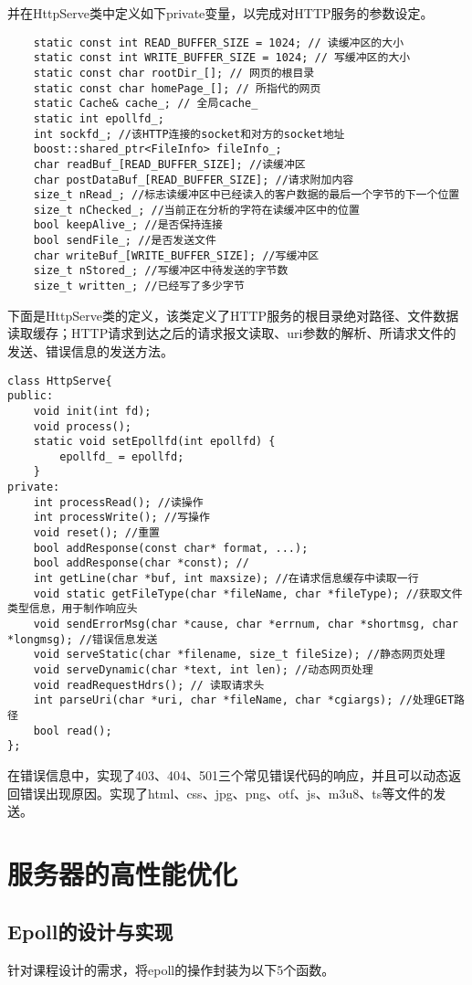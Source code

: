 \documentclass[bachelor]{thesis-uestc}
\begin{document}
并在HttpServe类中定义如下private变量，以完成对HTTP服务的参数设定。
\begin{lstlisting}
	static const int READ_BUFFER_SIZE = 1024; // 读缓冲区的大小
	static const int WRITE_BUFFER_SIZE = 1024; // 写缓冲区的大小
	static const char rootDir_[]; // 网页的根目录
	static const char homePage_[]; // 所指代的网页
	static Cache& cache_; // 全局cache_
	static int epollfd_;
	int sockfd_; //该HTTP连接的socket和对方的socket地址
	boost::shared_ptr<FileInfo> fileInfo_;
	char readBuf_[READ_BUFFER_SIZE]; //读缓冲区
	char postDataBuf_[READ_BUFFER_SIZE]; //请求附加内容
	size_t nRead_; //标志读缓冲区中已经读入的客户数据的最后一个字节的下一个位置
	size_t nChecked_; //当前正在分析的字符在读缓冲区中的位置
	bool keepAlive_; //是否保持连接
	bool sendFile_; //是否发送文件
	char writeBuf_[WRITE_BUFFER_SIZE]; //写缓冲区
	size_t nStored_; //写缓冲区中待发送的字节数
	size_t written_; //已经写了多少字节
\end{lstlisting}

下面是HttpServe类的定义，该类定义了HTTP服务的根目录绝对路径、文件数据读取缓存；HTTP请求到达之后的请求报文读取、uri参数的解析、所请求文件的发送、错误信息的发送方法。
\begin{lstlisting}
class HttpServe{
public:
	void init(int fd);
	void process();
	static void setEpollfd(int epollfd) {
		epollfd_ = epollfd;
	}
private:
	int processRead(); //读操作
	int processWrite(); //写操作
	void reset(); //重置
	bool addResponse(const char* format, ...); 
	bool addResponse(char *const); //
	int getLine(char *buf, int maxsize); //在请求信息缓存中读取一行
	void static getFileType(char *fileName, char *fileType); //获取文件类型信息，用于制作响应头
	void sendErrorMsg(char *cause, char *errnum, char *shortmsg, char *longmsg); //错误信息发送
	void serveStatic(char *filename, size_t fileSize); //静态网页处理
	void serveDynamic(char *text, int len); //动态网页处理
	void readRequestHdrs(); // 读取请求头
	int parseUri(char *uri, char *fileName, char *cgiargs); //处理GET路径
	bool read();
};
\end{lstlisting}

在错误信息中，实现了403、404、501三个常见错误代码的响应，并且可以动态返回错误出现原因。实现了html、css、jpg、png、otf、js、m3u8、ts等文件的发送。

\section{服务器的高性能优化}

\subsection{Epoll的设计与实现}
针对课程设计的需求，将epoll的操作封装为以下5个函数。
\end{document}
